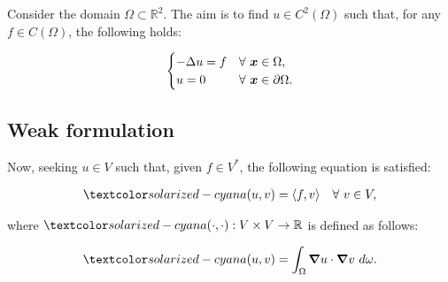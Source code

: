 Consider the domain $\Omega \subset \mathbb{R}^2$. The aim is to find $u \in C^2(\Omega)$ such that, for any $f \in C(\Omega)$, the following holds:

\begin{gather}
    \begin{cases} \label{strong_stokes}
        - \Delta u = f & \forall ~ \bm{x} \in \Omega, \\
        u = 0 & \forall ~ \bm{x} \in \partial \Omega.
    \end{cases}
\end{gather}

\subsection{Weak formulation}

Now, seeking $u \in V$ such that, given $f \in V^*$, the following equation is satisfied:

\begin{gather} \label{weak_stokes}
    \boa{u}{v} = \langle f, v \rangle \quad \Forall v \in V,
\end{gather}

where $\boa{\cdot}{\cdot}: V \times V \rightarrow \mathbb{R}$ is defined as follows:

\begin{gather}
    \boa{u}{v} = \int_{\Omega} \grad u \cdot \grad v ~ d \omega. \label{a}
\end{gather}